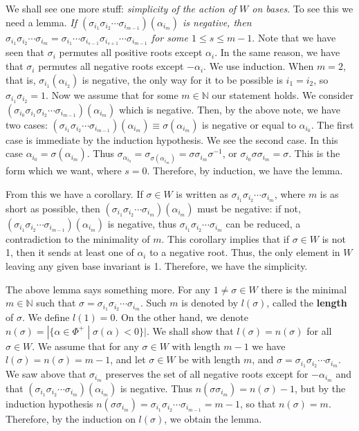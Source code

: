 \documentclass{article}
\newcommand{\NaN}{\mathbb{N}}
\newcommand{\SBar}{\;|\;}
\begin{document}
We shall see one more stuff: \textit{simplicity of the action of $W$ on bases}.
To see this we need a lemma.
\textit{If $(\sigma_{i_1} \sigma_{i_2} \cdots \sigma_{i_{m - 1}})(\alpha_{i_m})$ is negative, then $\sigma_{i_1} \sigma_{i_2} \cdots \sigma_{i_m} = \sigma_{i_1} \cdots\sigma_{i_{s - 1}} \sigma_{i_{s + 1}} \cdots \sigma_{i_{m - 1}}$ for some $1 \le s \le m - 1$}.
Note that we have seen that $\sigma_i$ permutes all positive roots except $\alpha_i$.
In the same reason, we have that $\sigma_i$ permutes all negative roots except $-\alpha_i$.
We use induction.
When $m = 2$, that is, $\sigma_{i_1}(\alpha_{i_2})$ is negative, the only way for it to be possible is $i_1 = i_2$, so $ \sigma_{i_1} \sigma_{i_2} = 1$.
Now we assume that for some $m \in \NaN$ our statement holds.
We consider $(\sigma_{i_0} \sigma_{i_1} \sigma_{i_2} \cdots \sigma_{i_{m - 1}})(\alpha_{i_m})$ which is negative.
Then, by the above note, we have two cases: $(\sigma_{i_1} \sigma_{i_2} \cdots \sigma_{i_{m - 1}})(\alpha_{i_m}) \equiv \sigma(\alpha_{i_m})$ is negative or equal to $\alpha_{i_0}$.
The first case is immediate by the induction hypothesis.
We see the second case.
In this case $\alpha_{i_0} = \sigma(\alpha_{i_m})$.
Thus $\sigma_{\alpha_{i_0}} = \sigma_{\sigma(\alpha_{i_m})} = \sigma \sigma_{i_m} \sigma^{-1}$, or $\sigma_{i_0} \sigma \sigma_{i_m} = \sigma$.
This is the form which we want, where $s = 0$.
Therefore, by induction, we have the lemma.

From this we have a corollary.
If $\sigma \in W$ is written as $\sigma_{i_1} \sigma_{i_2} \cdots \sigma_{i_m}$, where $m$ is as short as possible, then $(\sigma_{i_1} \sigma_{i_2} \cdots \sigma_{i_m})(\alpha_{i_m})$ must be negative: if not, $(\sigma_{i_1} \sigma_{i_2} \cdots \sigma_{i_{m - 1}})(\alpha_{i_m})$ is negative, thus $\sigma_{i_1} \sigma_{i_2} \cdots \sigma_{i_m}$ can be reduced, a contradiction to the minimality of $m$.
This corollary implies that if $\sigma \in W$ is not 1, then it sends at least one of $\alpha_i$ to a negative root.
Thus, the only element in $W$ leaving any given base invariant is 1.
Therefore, we have the simplicity.

The above lemma says something more.
For any $1 \ne \sigma \in W$ there is the minimal $m \in \NaN$ such that $\sigma = \sigma_{i_1} \sigma_{i_2} \cdots \sigma_{i_m}$.
Such $m$ is denoted by $l(\sigma)$, called the \textbf{length} of $\sigma$.
We define $l(1) = 0$.
On the other hand, we denote $n(\sigma) = |\{\alpha \in \Phi^+ \SBar \sigma(\alpha) < 0\}|$.
We shall show that $l(\sigma) = n(\sigma)$ for all $\sigma \in W$.
We assume that for any $\sigma \in W$ with length $m - 1$ we have $l(\sigma) = n(\sigma) = m - 1$, and let $\sigma \in W$ be with length $m$, and $\sigma = \sigma_{i_1} \sigma_{i_2} \cdots \sigma_{i_m}$.
We saw above that $\sigma_{i_m}$ preserves the set of all negative roots except for $-\alpha_{i_m}$ and that $(\sigma_{i_1} \sigma_{i_2} \cdots \sigma_{i_m})(\alpha_{i_m})$ is negative.
Thus $n(\sigma \sigma_{i_m}) = n(\sigma) - 1$, but by the induction hypothesis $n(\sigma \sigma_{i_m}) = \sigma_{i_1} \sigma_{i_2} \cdots \sigma_{i_{m - 1}} = m - 1$, so that $n(\sigma) = m$.
Therefore, by the induction on $l(\sigma)$, we obtain the lemma.
\end{document}
